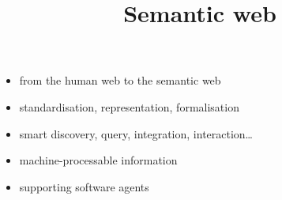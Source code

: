 \documentclass{sepslide-soa-faked} %
\title{Semantic web}
\begin{document}
\begin{slide}
  \Title
\end{slide}

\begin{slide}
  \Contents
\end{slide}

\begin{slide}
\begin{itemize}
\item from the human web to the semantic web
\item standardisation, representation, formalisation
\item smart discovery, query, integration, interaction\ldots
\item machine-processable information
\item supporting software agents
\end{itemize}
\end{slide}
\end{document}
